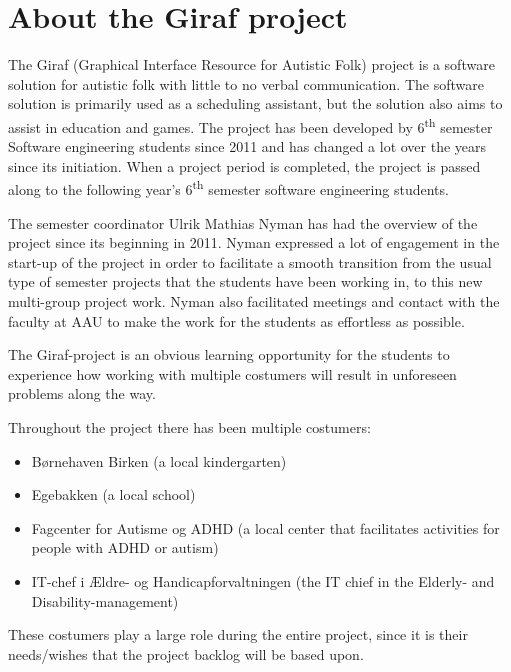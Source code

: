 \section{About the Giraf project}
The Giraf (Graphical Interface Resource for Autistic Folk) project is a software solution for autistic folk with little to no verbal communication.
The software solution is primarily used as a scheduling assistant, but the solution also aims to assist in education and games.
The project has been developed by 6\textsuperscript{th} semester Software engineering students since 2011 and has changed a lot over the years since its initiation.
When a project period is completed, the project is passed along to the following year's 6\textsuperscript{th} semester software engineering students.

The semester coordinator Ulrik Mathias Nyman has had the overview of the project since its beginning in 2011.
Nyman expressed a lot of engagement in the start-up of the project in order to facilitate a smooth transition from the usual type of semester projects that the students have been working in, to this new multi-group project work.
Nyman also facilitated meetings and contact with the faculty at AAU to make the work for the students as effortless as possible.

The Giraf-project is an obvious learning opportunity for the students to experience how working with multiple costumers will result in unforeseen problems along the way.

Throughout the project there has been multiple costumers:

\begin{itemize}
	\item Børnehaven Birken (a local kindergarten)
	\item Egebakken (a local school)
	\item Fagcenter for Autisme og ADHD (a local center that facilitates activities for people with ADHD or autism)
	\item IT-chef i Ældre- og Handicapforvaltningen (the IT chief in the Elderly- and Disability-management)
\end{itemize}

These costumers play a large role during the entire project, since it is their needs/wishes that the project backlog will be based upon.
